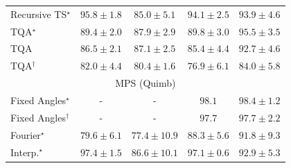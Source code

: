 \begin{tabular}{l|cccc|}
Recursive TS$^\star$ & {\cellcolor[HTML]{770C73}} \color[HTML]{F1F1F1} $95.8\pm 1.8$ & {\cellcolor[HTML]{8C93C4}} \color[HTML]{F1F1F1} $85.0\pm 5.1$ & {\cellcolor[HTML]{831F86}} \color[HTML]{F1F1F1} $94.1\pm 2.5$ & {\cellcolor[HTML]{842289}} \color[HTML]{F1F1F1} $93.9\pm 4.6$ \\
TQA$^\star$ & {\cellcolor[HTML]{8B5DAA}} \color[HTML]{F1F1F1} $89.4\pm 2.0$ & {\cellcolor[HTML]{8C70B3}} \color[HTML]{F1F1F1} $87.9\pm 2.9$ & {\cellcolor[HTML]{8A58A8}} \color[HTML]{F1F1F1} $89.8\pm 3.0$ & {\cellcolor[HTML]{7C0E78}} \color[HTML]{F1F1F1} $95.5\pm 3.5$ \\
TQA & {\cellcolor[HTML]{8C80BB}} \color[HTML]{F1F1F1} $86.5\pm 2.1$ & {\cellcolor[HTML]{8C79B8}} \color[HTML]{F1F1F1} $87.1\pm 2.5$ & {\cellcolor[HTML]{8C8FC2}} \color[HTML]{F1F1F1} $85.4\pm 4.4$ & {\cellcolor[HTML]{863394}} \color[HTML]{F1F1F1} $92.7\pm 4.6$ \\
TQA$^\dagger$ & {\cellcolor[HTML]{9AB4D6}} \color[HTML]{000000} $82.0\pm 4.4$ & {\cellcolor[HTML]{A6C2DD}} \color[HTML]{000000} $80.4\pm 1.6$ & {\cellcolor[HTML]{C8DAEA}} \color[HTML]{000000} $76.9\pm 6.1$ & {\cellcolor[HTML]{909ECA}} \color[HTML]{F1F1F1} $84.0\pm 5.8$ \\
\cline{1-5}
\multicolumn{5}{c}{\rule{0pt}{8pt}MPS (Quimb)} \\
\midrule
Fixed Angles$^\star$ & {\cellcolor[HTML]{000000}} \color[HTML]{F1F1F1} {\cellcolor{white}} \color{black} - & {\cellcolor[HTML]{000000}} \color[HTML]{F1F1F1} {\cellcolor{white}} \color{black} - & {\cellcolor[HTML]{6E2706}} \color[HTML]{F1F1F1} $98.1$ & {\cellcolor[HTML]{692606}} \color[HTML]{F1F1F1} $98.4\pm 1.2$ \\
Fixed Angles$^\dagger$ & {\cellcolor[HTML]{000000}} \color[HTML]{F1F1F1} {\cellcolor{white}} \color{black} - & {\cellcolor[HTML]{000000}} \color[HTML]{F1F1F1} {\cellcolor{white}} \color{black} - & {\cellcolor[HTML]{742905}} \color[HTML]{F1F1F1} $97.7$ & {\cellcolor[HTML]{742905}} \color[HTML]{F1F1F1} $97.7\pm 2.2$ \\
Fourier$^\star$ & {\cellcolor[HTML]{FED36F}} \color[HTML]{000000} $79.6\pm 6.1$ & {\cellcolor[HTML]{FEE596}} \color[HTML]{000000} $77.4\pm 10.9$ & {\cellcolor[HTML]{EB6F14}} \color[HTML]{F1F1F1} $88.3\pm 5.6$ & {\cellcolor[HTML]{CB4B02}} \color[HTML]{F1F1F1} $91.8\pm 9.3$ \\
Interp.$^\star$ & {\cellcolor[HTML]{782A05}} \color[HTML]{F1F1F1} $97.4\pm 1.5$ & {\cellcolor[HTML]{F5841E}} \color[HTML]{F1F1F1} $86.6\pm 10.1$ & {\cellcolor[HTML]{7C2C05}} \color[HTML]{F1F1F1} $97.1\pm 0.6$ & {\cellcolor[HTML]{BB4403}} \color[HTML]{F1F1F1} $92.9\pm 5.3$ \\

\end{tabular}
